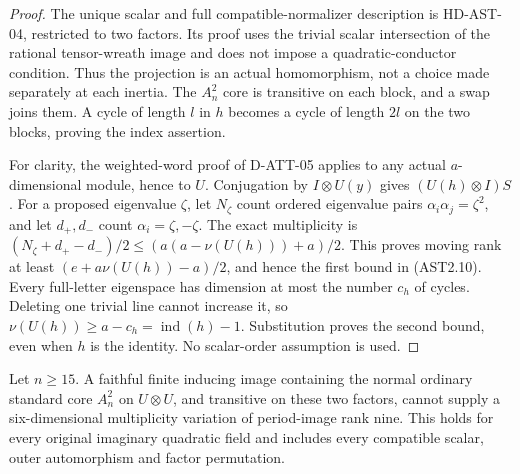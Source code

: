 \begin{proof}
The unique scalar and full compatible-normalizer description is
HD-AST-04, restricted to two factors. Its proof uses the trivial
scalar intersection of the rational tensor-wreath image and does
not impose a quadratic-conductor condition. Thus the projection
is an actual homomorphism, not a choice made separately at each
inertia. The $A_n^2$ core is transitive on each block, and a swap
joins them. A cycle of length $l$ in $h$ becomes a cycle of
length $2l$ on the two blocks, proving the index assertion.

For clarity, the weighted-word proof of D-ATT-05 applies to any
actual $a$-dimensional module, hence to $U$. Conjugation by
$I\otimes U(y)$ gives $(U(h)\otimes I)S$.
For a proposed eigenvalue $\zeta$, let $N_\zeta$ count ordered
eigenvalue pairs $\alpha_i\alpha_j=\zeta^2$, and let
$d_+,d_-$ count $\alpha_i=\zeta,-\zeta$.
The exact multiplicity is
$(N_\zeta+d_+-d_-)/2\le(a(a-\nu(U(h)))+a)/2$.
This proves moving rank at least
$(e+a\nu(U(h))-a)/2$, and hence the first bound in (AST2.10).
Every full-letter eigenspace has dimension at most the number
$c_h$ of cycles. Deleting one trivial line cannot increase it,
so $\nu(U(h))\ge a-c_h=\operatorname{ind}(h)-1$.
Substitution proves the second bound, even when $h$ is the
identity. No scalar-order assumption is used.
\end{proof}

\begin{theorem}
\label{HD-AST-09}
Let $n\ge15$. A faithful finite inducing image containing the
normal ordinary standard core $A_n^2$ on $U\otimes U$, and transitive
on these two factors, cannot supply a six-dimensional multiplicity
variation of period-image rank nine. This holds for every original
imaginary quadratic field and includes every compatible scalar,
outer automorphism and factor permutation.
\end{theorem}

